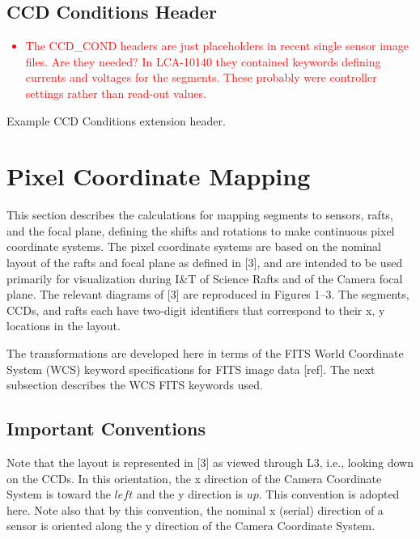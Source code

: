 \documentclass{article}[12pt]
\newcommand{\red}{\textcolor{red}}
\begin{document}
\subsection{CCD Conditions Header}

\red{
\begin{itemize}
\item{The CCD\_COND headers are just placeholders in recent single sensor image files.  Are they needed?  In LCA-10140 they contained keywords defining currents and voltages for the segments.  These probably were controller settings rather than read-out values.}
\end{itemize}
}

\begin{table}
\begin{alltt}

\end{alltt}
\caption{Example CCD Conditions extension header.\label{table:ccd_cond}}
\end{table}


\section{Pixel Coordinate Mapping}
This section describes the calculations for mapping segments to sensors, rafts, and the focal plane, defining the shifts and rotations to make continuous pixel coordinate systems.  The pixel coordinate systems are based on the nominal layout of the rafts and focal plane as defined in [3], and are intended to be used primarily for visualization during I\&T of Science Rafts and of the Camera focal plane.  The relevant diagrams of [3] are reproduced in Figures 1--3.  The segments, CCDs, and rafts each have two-digit identifiers that correspond to their x, y locations in the layout.

The transformations are developed here in terms of the FITS World Coordinate System (WCS) keyword specifications for FITS image data [ref].  The next subsection describes the WCS FITS keywords used.




\subsection{Important Conventions}
Note that the layout is represented in [3] as viewed through L3, i.e., looking down on the CCDs.  In this orientation, the x direction of the Camera Coordinate System is toward the $left$ and the y direction is $up$.  This convention is adopted here.  Note also that by this convention, the nominal x (serial) direction of a sensor is oriented along the y direction of the Camera Coordinate System.  
\end{document}
